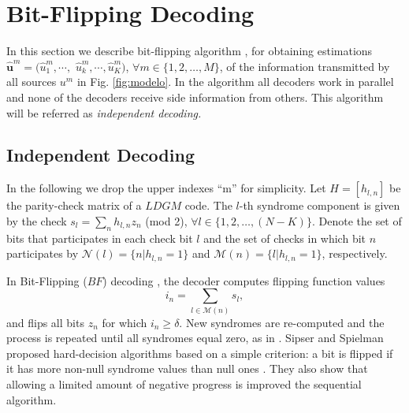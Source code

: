 \documentclass[journal]{IEEEtran}
\newenvironment{comment}[1][Comment]{#1. $\ll$ }{\ $\gg$ }
\begin{document}



\section{Bit-Flipping Decoding} \label{sec:BF}

In this section we describe bit-flipping algorithm \cite{kou,galaguer}, 
for obtaining estimations $\mathbf{\hat{u}}^{m}=(\hat{u}_1^{m}, \cdots,$ 
$\hat{u}_k^{m}, \cdots, \hat{u}_{K}^{m}) $, $\forall m \in \{1, 2, \ldots, M\}$, of the 
information transmitted by all sources $u^{m}$ in Fig. \ref{fig:modelo}. In the
algorithm all decoders work in parallel and none 
of the decoders receive side information from others. This algorithm 
will be referred as \textit{independent decoding.}


\subsection{Independent Decoding}
\label{Subsec:AlgDecInd}
In the following we drop the upper indexes ``m'' for simplicity.
Let $H=[h_{l,n}]$ be the parity-check matrix of a $LDGM$ code.
The $l$-th syndrome component is given by the check $s_{l}=\sum_{n} h_{l,n} z_{n}$ (mod 2), 
$\forall l \in \{1, 2, \ldots, (N-K)\}$.
  Denote the set of bits that participates in
each check bit $l$ and the set of checks in which bit $n$ participates by $\mathcal{N}(l)= \{n | h_{l,n}=1\}$ and
$\mathcal{M}(n)= \{ l | h_{l,n}=1\}$, respectively.

In Bit-Flipping ($BF$) decoding \cite{kou,galaguer}, the decoder computes flipping function values
\begin{equation}
i_{n}=\sum_{l\in \mathcal{M}(n)} s_{l},\label{Eq:En1}
\end{equation}
 and flips all bits $z_{n}$ for
which $i_{n} \geq \delta $. New syndromes are re-computed and the
process is repeated until all syndromes equal zero, as in \cite{kou}.
Sipser and Spielman proposed hard-decision algorithms based on a simple criterion:
a bit is flipped if it has  more non-null syndrome values than null ones \cite{sipser}. 
They also show that allowing a limited
amount of negative progress is improved the sequential algorithm. 
\end{document}
